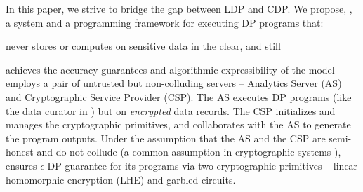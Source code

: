  
In this paper, we strive to bridge the gap between \textsf{LDP} and \textsf{CDP}. We propose, \system, a system and a programming framework for executing DP programs that: 
\squishlist
\item never stores or computes on sensitive data in the clear,
and still
\item achieves the accuracy guarantees and algorithmic expressibility of the \cdp model \squishend 
\system employs a pair of untrusted but non-colluding servers -- Analytics Server (\textsf{AS}) and  Cryptographic Service Provider (\textsf{CSP}). The \textsf{AS} executes DP programs (like the data curator in \cdp) but on \textit{encrypted} data records. The \textsf{CSP} initializes and manages the cryptographic primitives, and collaborates with the \textsf{AS} to generate the program outputs. Under the assumption that the \textsf{AS} and the \textsf{CSP} are semi-honest and do not collude (a common assumption in cryptographic systems \cite{Boneh1,Boneh2,Ridge2,Matrix2,secureML,LReg,Ver}), \system ensures $\epsilon$-DP guarantee for its programs via two cryptographic primitives -- linear homomorphic encryption (LHE) and garbled circuits. 

